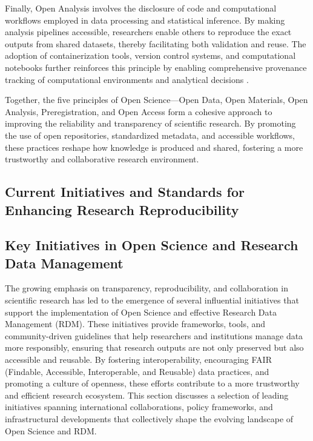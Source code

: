 \documentclass{article}
\begin{document}
Finally, Open Analysis involves the disclosure of code and computational workflows employed in data processing and statistical inference. By making analysis pipelines accessible, researchers enable others to reproduce the exact outputs from shared datasets, thereby facilitating both validation and reuse. The adoption of containerization tools, version control systems, and computational notebooks further reinforces this principle by enabling comprehensive provenance tracking of computational environments and analytical decisions \cite{van_dijk_open_2021, samuel_understanding_2021}.

Together, the five principles of Open Science—Open Data, Open Materials, Open Analysis, Preregistration, and Open Access form a cohesive approach to improving the reliability and transparency of scientific research. By promoting the use of open repositories, standardized metadata, and accessible workflows, these practices reshape how knowledge is produced and shared, fostering a more trustworthy and collaborative research environment.

\subsection{Current Initiatives and Standards for Enhancing Research Reproducibility}

\subsection{Key Initiatives in Open Science and Research Data Management}

The growing emphasis on transparency, reproducibility, and collaboration in scientific research has led to the emergence of several influential initiatives that support the implementation of Open Science and effective Research Data Management (RDM). These initiatives provide frameworks, tools, and community-driven guidelines that help researchers and institutions manage data more responsibly, ensuring that research outputs are not only preserved but also accessible and reusable. By fostering interoperability, encouraging FAIR (Findable, Accessible, Interoperable, and Reusable) data practices, and promoting a culture of openness, these efforts contribute to a more trustworthy and efficient research ecosystem. This section discusses a selection of leading initiatives spanning international collaborations, policy frameworks, and infrastructural developments that collectively shape the evolving landscape of Open Science and RDM.
\end{document}
